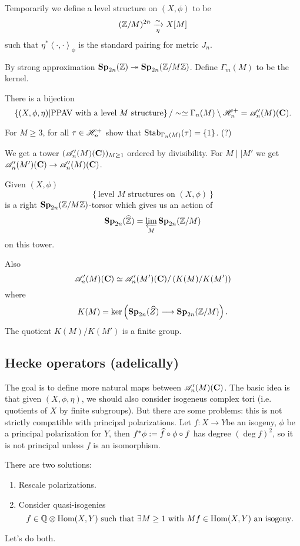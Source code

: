 	\begin{definition}
		Temporarily we define a level structure on $(X,\phi)$ to be
		\[
			(\mathbb Z /M)^{2n} \xrightarrow[\eta]{\sim} X[M]
		\]
		such that $\eta^{*}\left<\cdot ,\cdot  \right>_\phi$ is the standard pairing for metric $J_n$.
	\end{definition}
	\begin{fact}
		By strong approximation $\mathbf{Sp}_{2n}(\mathbb Z)\twoheadrightarrow \mathbf{Sp}_{2n}(\mathbb Z /M\mathbb Z)$. Define $\Gamma_m(M)$
		to be the kernel.
	\end{fact}
	\begin{corollary}
		There is a bijection
		\[
			\left\{ (X,\phi,\eta) \middle| \text{PPAV with a level }M\text{ structure} \right\} /
			\sim \simeq \Gamma_n(M) \setminus \mathscr H_n^{+} = \mathscr{A}_n'(M)(\mathbf{C}).
		\]
	\end{corollary}
	\begin{exercise}
		For $M\ge 3$, for all $\tau\in \mathscr H_n^{+}$ show that $\operatorname{Stab}_{\Gamma_n(M)}(\tau) = \{1\}$. (?)
	\end{exercise}
	We get a tower $(\mathscr{A}'_n(M)(\mathbf{C}))_{M\ge 1}$ ordered by divisibility. For $M \mid |M'$ we
	get $\CA_n'(M')(\C)\to \CA_n'(M)(\C)$.

	Given $(X,\phi)$
	\[
		\left\{ \text{level }M\text{ structures on }(X,\phi) \right\}
	\]
	is a right $\mathbf{Sp}_{2n}(\mathbb Z /M\mathbb Z)$-torsor which gives us an action of
	\[
		\mathbf{Sp}_{2n}(\widehat{\mathbb Z}) = \varprojlim_M \mathbf{Sp}_{2n}(\mathbb Z /M)
	\]
	on this tower.

	Also
	\[
		\mathscr{A}_n'(M)(\mathbf{C}) \simeq \mathscr{A}'_n(M')(\mathbf{C}) /\left( K(M) /K(M') \right)
	\]
	where
	\[
		K(M) = \ker\left( \Sp_{2n}(\wh{Z}) \to \Sp_{2n}(\Z /M) \right) .
	\]
	The quotient $K(M) /K(M')$ is a finite group.

	\subsection{Hecke operators (adelically)}
	The goal is to define more natural maps between $\mathscr{A}_n'(M)(\mathbf{C})$. The basic idea is that
	given $(X,\phi,\eta)$, we should also consider isogeneus complex tori (i.e. quotients of
	$X$ by finite subgroups). But there are some problems: this is not strictly compatible
	with principal polarizations. Let $f:X\to Y$be an isogeny, $\phi$ be a principal
	polarization for $Y$, then $f^{*}\phi:= \widehat{f}\circ \phi \circ f$ has degree $(\deg
	f)^2$, so it is not principal unless $f$ is an isomorphism.

	There are two solutions:
\begin{enumerate}[1)]
	\item Rescale polarizations.
	\item Consider quasi-isogenies
		\[
			f\in \mathbb Q\otimes\operatorname{Hom}(X,Y) \text{ such that }\exists M\ge 1 \text{ with } Mf\in \operatorname{Hom}(X,Y)
			\text{ an isogeny}.
		\]
\end{enumerate}
Let's do both.

